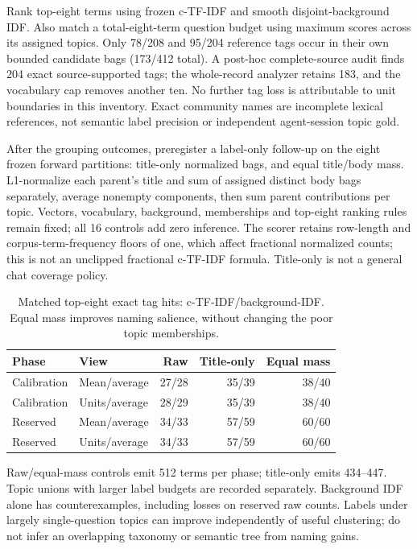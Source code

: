 \documentclass[11pt]{article}
\begin{document}
Rank top-eight terms using frozen c-TF-IDF and smooth disjoint-background IDF.
Also match a total-eight-term question budget using maximum scores across its
assigned topics. Only 78/208 and 95/204 reference tags occur in their own bounded
candidate bags (173/412 total). A post-hoc complete-source audit finds 204 exact
source-supported tags; the whole-record analyzer retains 183, and the vocabulary
cap removes another ten. No further tag loss is attributable to unit boundaries
in this inventory. Exact community names are incomplete lexical references, not
semantic label precision or independent agent-session topic gold.

After the grouping outcomes, preregister a label-only follow-up on the eight
frozen forward partitions: title-only normalized bags, and equal title/body mass.
L1-normalize each parent's title and sum of assigned distinct body bags
separately, average nonempty components, then sum parent contributions per topic.
Vectors, vocabulary, background, memberships and top-eight ranking rules remain
fixed; all 16 controls add zero inference. The scorer retains row-length and
corpus-term-frequency floors of one, which affect fractional normalized counts;
this is not an unclipped fractional c-TF-IDF formula. Title-only is not a general
chat coverage policy.

\begin{table}[ht]
\centering\small
\begin{tabular}{llrrr}
\toprule
Phase & View & Raw & Title-only & Equal mass\\
\midrule
Calibration & Mean/average & 27/28 & 35/39 & 38/40\\
Calibration & Units/average & 28/29 & 35/39 & 38/40\\
Reserved & Mean/average & 34/33 & 57/59 & 60/60\\
Reserved & Units/average & 34/33 & 57/59 & 60/60\\
\bottomrule
\end{tabular}
\caption{Matched top-eight exact tag hits: c-TF-IDF/background-IDF. Equal mass
improves naming salience, without changing the poor topic memberships.}
\end{table}

Raw/equal-mass controls emit 512 terms per phase; title-only emits 434--447.
Topic unions with larger label budgets are recorded separately. Background IDF
alone has counterexamples, including losses on reserved raw counts. Labels under
largely single-question topics can improve independently of useful clustering;
do not infer an overlapping taxonomy or semantic tree from naming gains.
\end{document}
